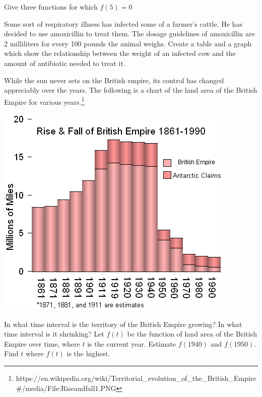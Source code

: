 \begin{exercise}
Give three functions for which $f(5) = 0$
\end{exercise}
\bigskip

\begin{exercise}
Some sort of respiratory illness has infected some of a farmer's cattle.  He has decided to use amoxicillin to treat them.  The dosage guidelines of amoxicillin are 2 milliliters for every 100 pounds the animal weighs.  Create a table and a graph which show the relationship between the weight of an infected cow and the amount of antibiotic needed to treat it.
\end{exercise}


\pagebreak

\begin{exercise}
While the sun never sets on the British empire, its control has changed appreciably over the years.  The following is a chart of the land area of the British Empire for various years.\footnote{https://en.wikipedia.org/wiki/Territorial\_evolution\_of\_the\_British\_Empire\#/media/File:Riseandfall1.PNG}

\begin{center}
\includegraphics{images/Riseandfall1.png}
\end{center}



In what time interval is the territory of the British Empire growing?  In what time interval is it shrinking?  Let $f(t)$ be the function of land area of the British Empire over time, where $t$ is the current year.  Estimate $f(1940)$ and $f(1950)$.  Find $t$ where $f(t)$ is the highest.

\end{exercise}
\bigskip

